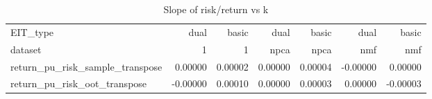 \begin{table}
\centering
\caption{Slope of risk/return vs k}
\begin{tabular}{lrrrrrr}
\toprule
EIT\_type &     dual &   basic &    dual &   basic &     dual &    basic \\
dataset &        1 &       1 &    npca &    npca &      nmf &      nmf \\
\midrule
return\_pu\_risk\_sample\_transpose &  0.00000 & 0.00002 & 0.00000 & 0.00004 & -0.00000 &  0.00000 \\
return\_pu\_risk\_oot\_transpose    & -0.00000 & 0.00010 & 0.00000 & 0.00003 &  0.00000 & -0.00003 \\
\bottomrule
\end{tabular}
\end{table}

